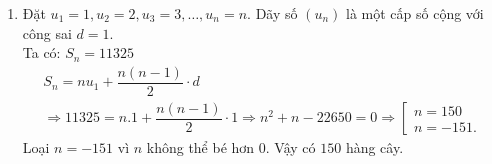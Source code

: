 \begin{bt}
{\begin{enumerate}
			\[q\cdot(q-1)=2\Leftrightarrow q^2-q=2\Leftrightarrow q^2-q-2=0\Leftrightarrow \left[\begin{array}{l} {q=2} \\ {q=-1.} \end{array}\right.\] Với $q=2$ thay vào (1) ta được $v_1=1$.\\			
			Với $q=-1$ thay vào (1) ta được $v_1=7$.\\			
			Vậy số hạng đầu $v_1=1$ và công bội $q=2$ hoặc số hạng đầu $v_1=7$ và công bội $q=-1$.			
			\item  Đặt $u_1=1, u_2=2, u_3=3,\dots, u_n=n$. Dãy số $(u_n )$ là một cấp số cộng với công sai $d = 1$.\\
			Ta có: $S_n=11325$
			\[\begin{array}{l} {S_n=nu_1+\dfrac{n(n-1)}{2}\cdot d} \\ {\Rightarrow 11325=n.1+\dfrac{n(n-1)}{2}\cdot 1\Rightarrow n^2+n-22650=0\Rightarrow \left[\begin{array}{l} {n=150} \\ {n=-151.} \end{array}\right.} \end{array}\] Loại $n=-151$ vì $n$ không thể bé hơn $0$. Vậy có $150$ hàng cây.
		\end{enumerate}
	}
	\end{bt}

